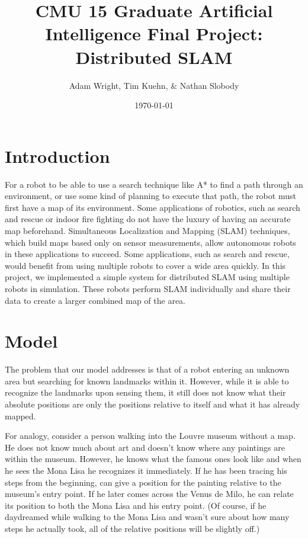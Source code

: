 \documentclass[prodmode,acmtecs]{acmsmall} %
\title{
    CMU 15\-780 Graduate Artificial Intelligence
    Final Project: Distributed SLAM
}
\author{
    Adam Wright, Tim Kuehn, \& Nathan Slobody \\
}
\date{\today}
\begin{document}
\maketitle

\setcounter{tocdepth}{2}

\section{Introduction}

For a robot to be able to use a search technique like A* to find a path through an environment, or use some kind of planning to execute that path, the robot must first have a map of its environment. Some applications of robotics, such as search and rescue or indoor fire fighting do not have the luxury of having an accurate map beforehand. Simultaneous Localization and Mapping (SLAM) techniques, which build maps based only on sensor measurements, allow autonomous robots in these applications to succeed. Some applications, such as search and rescue, would benefit from using multiple robots to cover a wide area quickly. In this project, we implemented a simple system for distributed SLAM using multiple robots in simulation.  These robots perform SLAM individually and share their data to create a larger combined map of the area.

\section{Model}

The problem that our model addresses is that of a robot entering an unknown area but searching for known landmarks within it.  However, while it is able to recognize the landmarks upon sensing them, it still does not know what their absolute positions are \- only the positions relative to itself and what it has already mapped.

For analogy, consider a person walking into the Louvre museum without a map.  He does not know much about art and doesn't know where any paintings are within the museum.  However, he knows what the famous ones look like and when he sees the Mona Lisa he recognizes it immediately. If he has been tracing his steps from the beginning, can give a position for the painting relative to the museum's entry point.  If he later comes across the Venus de Milo, he can relate its position to both the Mona Lisa and his entry point.  (Of course, if he daydreamed while walking to the Mona Lisa and wasn't sure about how many steps he actually took, all of the relative positions will be slightly off.)
\end{document}
